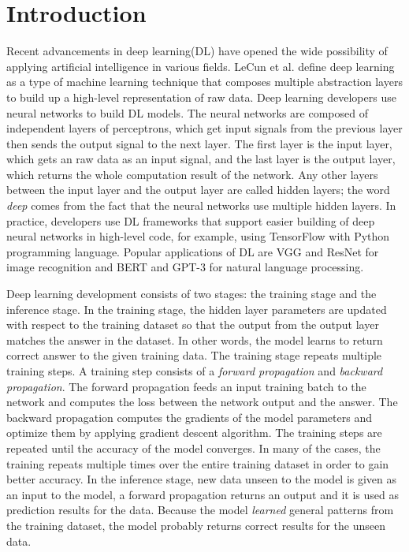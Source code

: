 \section{Introduction}\label{sec:intro}

Recent advancements in deep learning(DL) have opened the wide possibility of
applying artificial intelligence in various fields.
LeCun et al.\cite{LeCun2015} define deep learning as a
type of machine learning technique that composes multiple
abstraction layers to build up a high-level representation of raw data. 
Deep learning developers use neural networks to build DL models.
The neural networks are composed of independent layers of perceptrons,
which get input signals from the previous layer then sends the
output signal to the next layer.
The first layer is the input layer, which gets an raw data as an input signal,
and the last layer is the output layer, which returns the
whole computation result of the network.
Any other layers between the input layer and the output layer are 
called hidden layers; the word \textit{deep} comes from the fact that
the neural networks use multiple hidden layers.
In practice, developers use DL frameworks that support easier building of
deep neural networks in high-level code, for example, using
TensorFlow\cite{tensorflow} with Python programming language\cite{pythonref}.
Popular applications of DL are
VGG\cite{vggnet2014} and ResNet\cite{resnet2015} for image recognition 
and BERT\cite{bert2018} and GPT-3\cite{gpt32020} for natural language processing.

Deep learning development consists of two stages: 
the training stage and the inference stage.
In the training stage, the hidden layer parameters are updated
with respect to the training dataset so that the output from the output layer
matches the answer in the dataset. In other words, the model learns
to return correct answer to the given training data. 
The training stage repeats multiple training steps.
A training step consists of a \textit{forward propagation} and 
\textit{backward propagation}.
The forward propagation feeds an input training batch to the
network and computes the loss between the network output and the answer.
The backward propagation computes the gradients of the model parameters
and optimize them by applying gradient descent algorithm. 
The training steps are repeated until the accuracy of the model converges.
In many of the cases, the training repeats multiple times over the entire 
training dataset in order to gain better accuracy.  
In the inference stage, new data unseen to the model
is given as an input to the model, a forward propagation returns an output
and it is used as prediction results for the data.
Because the model \textit{learned} general patterns from the training
dataset, the model probably returns correct results for the
unseen data.

